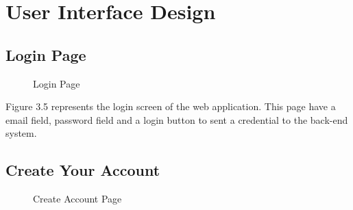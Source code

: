 \documentclass[12pt,oneside,openright,a4paper]{cpe-english-project}
\begin{document}
\section{User Interface Design}

\subsection{Login Page}

\begin{figure}[!h]
\centering
{}
\caption{Login Page}\label{fig:login}
\end{figure}

Figure 3.5 represents the login screen of the web application. This page have a email field,  password field and a login button to sent a credential to the back-end system. 

\subsection{Create Your Account }

\begin{figure}[!h]
\centering
{}
\caption{Create Account Page}\label{fig:create-acc}
\end{figure}
\end{document}
